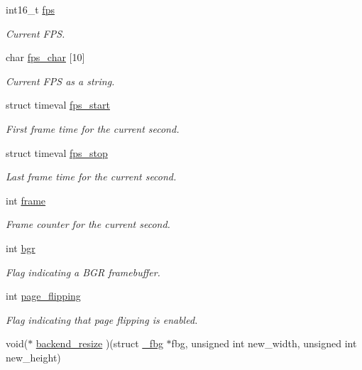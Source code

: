 \begin{DoxyCompactItemize}
int16\+\_\+t \mbox{\hyperlink{struct__fbg_a64b16363bc48d1e19141df2e242930a9}{fps}}
\begin{DoxyCompactList}\small\item\em Current F\+PS. \end{DoxyCompactList}\item 
char \mbox{\hyperlink{struct__fbg_af447e6ed58d893989c8dad075807a79b}{fps\+\_\+char}} \mbox{[}10\mbox{]}
\begin{DoxyCompactList}\small\item\em Current F\+PS as a string. \end{DoxyCompactList}\item 
struct timeval \mbox{\hyperlink{struct__fbg_a07d7bb827a7595c956fe22c2d65bba33}{fps\+\_\+start}}
\begin{DoxyCompactList}\small\item\em First frame time for the current second. \end{DoxyCompactList}\item 
struct timeval \mbox{\hyperlink{struct__fbg_ade17a45bbc82bef326857c2837cdf66c}{fps\+\_\+stop}}
\begin{DoxyCompactList}\small\item\em Last frame time for the current second. \end{DoxyCompactList}\item 
int \mbox{\hyperlink{struct__fbg_aa3ef83f919d12e680f8c64006b441454}{frame}}
\begin{DoxyCompactList}\small\item\em Frame counter for the current second. \end{DoxyCompactList}\item 
int \mbox{\hyperlink{struct__fbg_a5844c5bf4789117cbc0c972ff160b338}{bgr}}
\begin{DoxyCompactList}\small\item\em Flag indicating a B\+GR framebuffer. \end{DoxyCompactList}\item 
int \mbox{\hyperlink{struct__fbg_ad32509bca6ac4fb467476834cb8ce9d2}{page\+\_\+flipping}}
\begin{DoxyCompactList}\small\item\em Flag indicating that page flipping is enabled. \end{DoxyCompactList}\item 
void($\ast$ \mbox{\hyperlink{struct__fbg_aef07a92ae059ea2a43653f4d0c5d928e}{backend\+\_\+resize}} )(struct \mbox{\hyperlink{struct__fbg}{\+\_\+fbg}} $\ast$fbg, unsigned int new\+\_\+width, unsigned int new\+\_\+height)

\end{DoxyCompactItemize}
